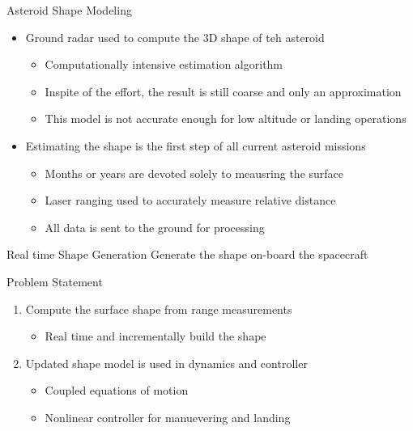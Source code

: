 \documentclass[11pt,professionalfonts]{beamer}
\begin{document}
\begin{frame}{Asteroid Shape Modeling}
    \begin{itemize}
        \item Ground radar used to compute the 3D shape of teh asteroid
        \begin{itemize}
            \item Computationally intensive estimation algorithm 
            \item Inspite of the effort, the result is still coarse and only an approximation
            \item This model is not accurate enough for low altitude or landing operations
        \end{itemize}
    \item Estimating the shape is the first step of all current asteroid missions
    \begin{itemize}
        \item Months or years are devoted solely to meausring the surface
        \item Laser ranging used to accurately measure relative distance
        \item All data is sent to the ground for processing
    \end{itemize}
    \end{itemize}

    \begin{block}{Real time Shape Generation}
        Generate the shape on-board the spacecraft
    \end{block}
\end{frame}

\begin{frame}{Problem Statement}
\begin{enumerate}
    \item Compute the surface shape from range measurements
        \begin{itemize}
            \item Real time and incrementally build the shape
        \end{itemize}
    \item Updated shape model is used in dynamics and controller
        \begin{itemize}
            \item Coupled equations of motion 
            \item Nonlinear controller for manuevering and landing
        \end{itemize}
\end{enumerate}
\end{frame}
\end{document}
